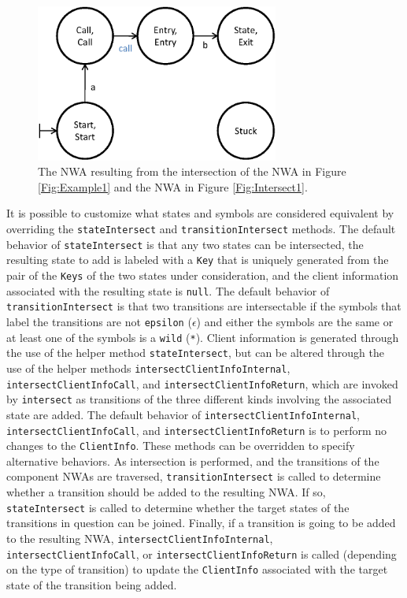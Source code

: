 \documentclass{llncs}
\begin{document}
\begin{figure}[htbp]
  \centering
    \includegraphics[width=8cm]{Figures/Figure6.eps}
  \caption{The NWA resulting from the intersection of the NWA in Figure \ref{Fig:Example1} and the NWA in Figure \ref{Fig:Intersect1}.}
  \label{Fig:Intersect2}
\end{figure}

It is possible to customize what states and symbols are considered equivalent by overriding the \texttt{stateIntersect} and \texttt{transitionIntersect} methods.  The default behavior of \texttt{stateIntersect} is that any two states can be intersected, the resulting state to add is labeled with a \texttt{Key} that is uniquely generated from the pair of the \texttt{Keys} of the two states under consideration, and the client information associated with the resulting state is \texttt{null}.  The default behavior of \texttt{transitionIntersect} is that two transitions are intersectable if the symbols that label the transitions are not \texttt{epsilon} (\texttt{$\epsilon$}) and either the symbols are the same or at least one of the symbols is a \texttt{wild} (\texttt{*}). Client information is generated through the use of the helper method \texttt{stateIntersect}, but can be altered through the use of the helper methods \texttt{intersectClientInfoInternal}, \texttt{intersectClientInfoCall}, and  \texttt{intersectClientInfoReturn}, which are invoked by \texttt{intersect} as transitions of the three different kinds involving the associated state are added.  The default behavior of \texttt{intersectClientInfoInternal}, \texttt{intersectClientInfoCall}, and \texttt{intersectClientInfoReturn} is to perform no changes to the \texttt{ClientInfo}.  These methods can be overridden to specify alternative behaviors. As intersection is performed, and the transitions of the component NWAs are traversed, \texttt{transitionIntersect} is called to determine whether a transition should be added to the resulting NWA.  If so, \texttt{stateIntersect} is called to determine whether the target states of the transitions in question can be joined.  Finally, if a transition is going to be added to the resulting NWA, \texttt{intersectClientInfoInternal}, \texttt{intersectClientInfoCall}, or \texttt{intersectClientInfoReturn} is called (depending on the type of transition) to update the \texttt{ClientInfo} associated with the target state of the transition being added. \\
\end{document}
